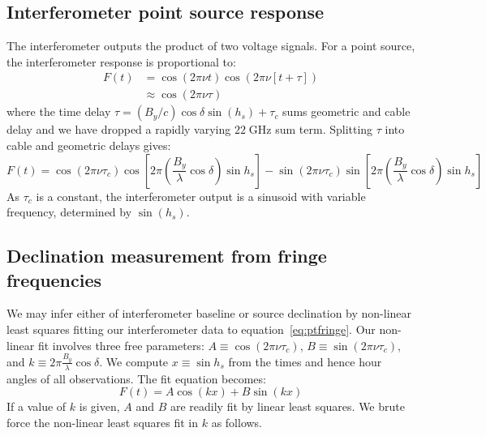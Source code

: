 \documentclass[10pt]{article}
\newcommand {\mt}{\mathrm}
\newcommand {\unit}[1]{\; \mt{#1}}
\begin{document}
\subsection{Interferometer point source response}

The interferometer outputs the product of two voltage signals.  For a point source, the interferometer response is proportional to:
\begin{align*}
	F(t) &= \cos(2\pi\nu t) \cos\left(2\pi\nu \left[ t + \tau \right] \right) \\
		 &\approx \cos\left(2\pi\nu \tau\right)
\end{align*}
where the time delay $\tau = (B_y / c) \cos\delta \sin(h_s) + \tau_c$ sums geometric and cable delay and we have dropped a rapidly varying $22 \unit{GHz}$ sum term.
Splitting $\tau$ into cable and geometric delays gives:
\begin{equation} \label{eq:ptfringe}
	F(t) = \cos(2\pi\nu\tau_c)
			\cos \left[2\pi \left(\frac{B_y}{\lambda}\cos\delta\right)
			           \sin h_s \right]
			- \sin(2\pi\nu\tau_c)
			\sin \left[2\pi \left(\frac{B_y}{\lambda}\cos\delta\right)
			           \sin h_s \right]
\end{equation}
As $\tau_c$ is a constant, the interferometer output is a sinusoid with variable frequency, determined by $\sin(h_s)$.

\subsection{Declination measurement from fringe frequencies}

We may infer either of interferometer baseline or source declination by non-linear least squares fitting our interferometer data to equation~\ref{eq:ptfringe}.  Our non-linear fit involves three free parameters: $A \equiv \cos(2\pi\nu\tau_c)$, $B \equiv \sin(2\pi\nu\tau_c)$, and $k \equiv 2\pi \frac{B_y}{\lambda}\cos\delta$.  We compute $x \equiv \sin h_s$ from the times and hence hour angles of all observations.  The fit equation becomes:
\[
    F(t) = A \cos(k x) + B \sin(k x)
\]
If a value of $k$ is given, $A$ and $B$ are readily fit by linear least squares.  We brute force the non-linear least squares fit in $k$ as follows.
\end{document}
